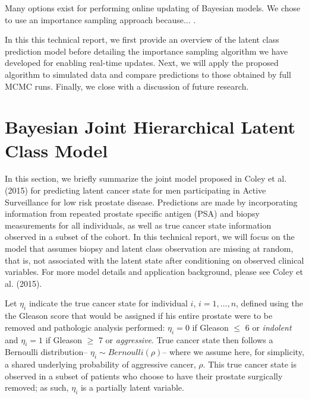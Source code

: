 \documentclass[12pt, letterpaper]{article}
\begin{document}
Many options exist for performing online updating of Bayesian models. We chose to use an importance sampling approach because... \cite{Geweke1989}.

In this this technical report, we first provide an overview of the latent class prediction model before detailing the importance sampling algorithm we have developed for enabling real-time updates. Next, we will apply the proposed algorithm to simulated data and compare predictions to those obtained by full MCMC runs. Finally, we close with a discussion of future research.

\section{Bayesian Joint Hierarchical Latent Class Model}
In this section, we briefly summarize the joint model proposed in Coley et al. (2015) for predicting latent cancer state for men participating in Active Surveillance for low risk prostate disease. Predictions are made by incorporating information from repeated prostate specific antigen (PSA) and biopsy measurements for all individuals, as well as true cancer state information observed in a subset of the cohort. In this technical report, we will focus on the model that assumes biopsy and latent class observation are missing at random, that is, not associated with the latent state after conditioning on observed clinical variables. For more model details and application background, please see Coley et al. (2015). 

Let $\eta_i$ indicate the true cancer state for individual $i$, $i=1,\dots,n$, defined using the the Gleason score \cite{Gleason1977, Gleason1992} that would be assigned if his entire prostate were to be removed and pathologic analysis performed: $\eta_i=0$ if Gleason $\leq$ 6 or \textit{indolent} and $\eta_i=1$ if Gleason $\geq$ 7 or \textit{aggressive}. True cancer state then follows a Bernoulli distribution-- $\eta_i\sim Bernoulli(\rho)$-- where we assume here, for simplicity, a shared underlying probability of aggressive cancer, $\rho$. This true cancer state is observed in a subset of patients who choose to have their prostate surgically removed; as such, $\eta_i$ is a partially latent variable.
\end{document}
